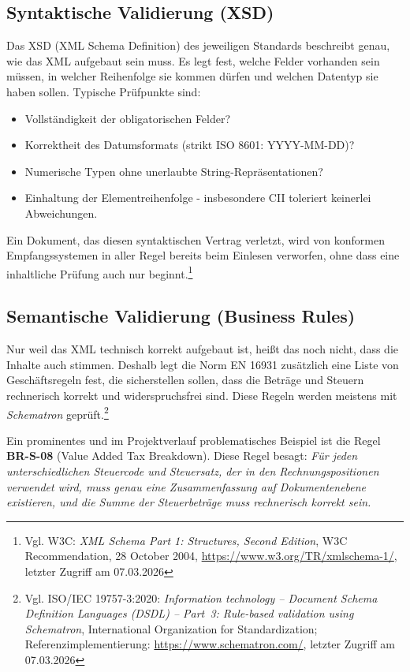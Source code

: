 \subsection{Syntaktische Validierung (XSD)}
Das XSD (XML Schema Definition) des jeweiligen Standards beschreibt genau, wie das XML aufgebaut sein muss. Es legt fest, welche Felder vorhanden sein müssen, in welcher Reihenfolge sie kommen dürfen und welchen Datentyp sie haben sollen. Typische Prüfpunkte sind:
\begin{itemize}
    \item Vollständigkeit der obligatorischen Felder?
    \item Korrektheit des Datumsformats (strikt ISO 8601: YYYY-MM-DD)?
    \item Numerische Typen ohne unerlaubte String-Repräsentationen?
    \item Einhaltung der Elementreihenfolge - insbesondere CII toleriert keinerlei Abweichungen.
\end{itemize}
Ein Dokument, das diesen syntaktischen Vertrag verletzt, wird von konformen Empfangssystemen in aller Regel bereits beim Einlesen verworfen, ohne dass eine inhaltliche Prüfung auch nur beginnt.\footnote{Vgl. W3C: \textit{XML Schema Part 1: Structures, Second Edition}, W3C Recommendation, 28 October 2004, \url{https://www.w3.org/TR/xmlschema-1/}, letzter Zugriff am 07.03.2026}

\subsection{Semantische Validierung (Business Rules)}
Nur weil das XML technisch korrekt aufgebaut ist, heißt das noch nicht, dass die Inhalte auch stimmen. Deshalb legt die Norm EN 16931 zusätzlich eine Liste von Geschäftsregeln fest, die sicherstellen sollen, dass die Beträge und Steuern rechnerisch korrekt und widerspruchsfrei sind. Diese Regeln werden meistens mit \textit{Schematron} geprüft.\footnote{Vgl. ISO/IEC 19757-3:2020: \textit{Information technology -- Document Schema Definition Languages (DSDL) -- Part~3: Rule-based validation using Schematron}, International Organization for Standardization; Referenzimplementierung: \url{https://www.schematron.com/}, letzter Zugriff am 07.03.2026}

Ein prominentes und im Projektverlauf problematisches Beispiel ist die Regel \textbf{BR-S-08} (Value Added Tax Breakdown).
Diese Regel besagt: \textit{Für jeden unterschiedlichen Steuercode und Steuersatz, der in den Rechnungspositionen verwendet wird, muss genau eine Zusammenfassung auf Dokumentenebene existieren, und die Summe der Steuerbeträge muss rechnerisch korrekt sein.}

